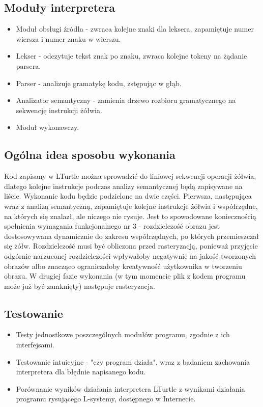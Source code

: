 \documentclass{article}
\begin{document}
\subsection{Moduły interpretera}
\begin{itemize}
    \item{Moduł obsługi źródła - zwraca kolejne znaki dla leksera, zapamiętuje numer wiersza i numer znaku w wierszu.}
    \item{Lekser - odczytuje tekst znak po znaku, zwraca kolejne tokeny na żądanie parsera.}
    \item{Parser - analizuje gramatykę kodu, zstępując w głąb.}
    \item{Analizator semantyczny - zamienia drzewo rozbioru gramatycznego na sekwencję instrukcji żółwia.}
    \item{Moduł wykonawczy.}
\end{itemize}

\subsection{Ogólna idea sposobu wykonania}
Kod zapisany w LTurtle można sprowadzić do liniowej sekwencji operacji żółwia, dlatego kolejne instrukcje podczas analizy semantycznej będą zapisywane na liście. Wykonanie kodu będzie podzielone na dwie części. Pierwsza, następująca wraz z analizą semantyczną, zapamiętuje kolejne instrukcje żółwia i współrzędne, na których się znalazł, ale niczego nie rysuje. Jest to spowodowane koniecznością spełnienia wymagania funkcjonalnego nr 3 - rozdzielczość obrazu jest dostosowywana dynamicznie do zakresu współrzędnych, po których przemieszczał się żółw. Rozdzielczość musi być obliczona przed rasteryzacją, ponieważ przyjęcie odgórnie narzuconej rozdzielczości wpływałoby negatywnie na jakość tworzonych obrazów albo znacząco ograniczałoby kreatywność użytkownika w tworzeniu obrazu. W drugiej fazie wykonania (w tym momencie plik z kodem programu może już być zamknięty) następuje rasteryzacja.

\subsection{Testowanie}
\begin{itemize}
    \item{Testy jednostkowe poszczególnych modułów programu, zgodnie z ich interfejsami.}
    \item{Testowanie intuicyjne - "czy program działa", wraz z badaniem zachowania interpretera dla błędnie napisanego kodu.}
    \item{Porównanie wyników działania interpretera LTurtle z wynikami działania programu rysującego L-systemy, dostępnego w Internecie.}
\end{itemize}
\end{document}
